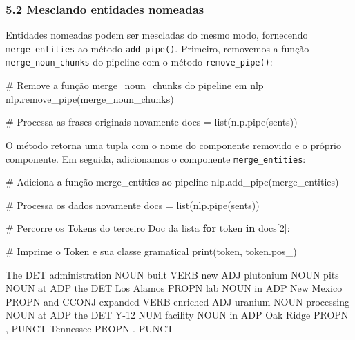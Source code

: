 \documentclass[
  brazilian,
  11pt,
]{article}
\newenvironment{Shaded}{\begin{snugshade}}{\end{snugshade}}
\newcommand{\BuiltInTok}[1]{\textcolor[rgb]{0.50,0.55,0.55}{#1}}
\newcommand{\CommentTok}[1]{\textcolor[rgb]{0.48,0.49,0.49}{#1}}
\newcommand{\ControlFlowTok}[1]{\textcolor[rgb]{0.99,0.74,0.29}{\textbf{#1}}}
\newcommand{\DecValTok}[1]{\textcolor[rgb]{0.96,0.45,0.00}{#1}}
\newcommand{\KeywordTok}[1]{\textcolor[rgb]{0.81,0.81,0.76}{\textbf{#1}}}
\newcommand{\NormalTok}[1]{\textcolor[rgb]{0.81,0.81,0.76}{#1}}
\newcommand{\OperatorTok}[1]{\textcolor[rgb]{0.81,0.81,0.76}{#1}}
\newcommand{\StringTok}[1]{\textcolor[rgb]{0.96,0.31,0.31}{#1}}
\let\oldtexttt\texttt
\renewcommand{\texttt}[1]{{\color{inlink}\oldtexttt{#1}}}
\begin{document}
\subsubsection{5.2 Mesclando entidades
nomeadas}\label{mesclando-entidades-nomeadas}

Entidades nomeadas podem ser mescladas do mesmo modo, fornecendo
\texttt{merge\_entities} ao método \texttt{add\_pipe()}. Primeiro,
removemos a função \texttt{merge\_noun\_chunks} do pipeline com o método
\texttt{remove\_pipe()}:

\begin{Shaded}
\begin{Highlighting}[]
\CommentTok{\# Remove a função \textquotesingle{}merge\_noun\_chunks\textquotesingle{} do pipeline em \textquotesingle{}nlp\textquotesingle{}}
\NormalTok{nlp.remove\_pipe(}\StringTok{\textquotesingle{}merge\_noun\_chunks\textquotesingle{}}\NormalTok{)}

\CommentTok{\# Processa as frases originais novamente}
\NormalTok{docs }\OperatorTok{=} \BuiltInTok{list}\NormalTok{(nlp.pipe(sents))}
\end{Highlighting}
\end{Shaded}

O método retorna uma tupla com o nome do componente removido e o próprio
componente. Em seguida, adicionamos o componente
\texttt{merge\_entities}:

\begin{Shaded}
\begin{Highlighting}[]
\CommentTok{\# Adiciona a função \textquotesingle{}merge\_entities\textquotesingle{} ao pipeline}
\NormalTok{nlp.add\_pipe(}\StringTok{\textquotesingle{}merge\_entities\textquotesingle{}}\NormalTok{)}

\CommentTok{\# Processa os dados novamente}
\NormalTok{docs }\OperatorTok{=} \BuiltInTok{list}\NormalTok{(nlp.pipe(sents))}

\CommentTok{\# Percorre os Tokens do terceiro Doc da lista}
\ControlFlowTok{for}\NormalTok{ token }\KeywordTok{in}\NormalTok{ docs[}\DecValTok{2}\NormalTok{]:}

    \CommentTok{\# Imprime o Token e sua classe gramatical}
    \BuiltInTok{print}\NormalTok{(token, token.pos\_)}
\end{Highlighting}
\end{Shaded}

\begin{Shaded}
\begin{Highlighting}[]
\NormalTok{The DET}
\NormalTok{administration NOUN}
\NormalTok{built VERB}
\NormalTok{new ADJ}
\NormalTok{plutonium NOUN}
\NormalTok{pits NOUN}
\NormalTok{at ADP}
\NormalTok{the DET}
\NormalTok{Los Alamos PROPN}
\NormalTok{lab NOUN}
\NormalTok{in ADP}
\NormalTok{New Mexico PROPN}
\NormalTok{and CCONJ}
\NormalTok{expanded VERB}
\NormalTok{enriched ADJ}
\NormalTok{uranium NOUN}
\NormalTok{processing NOUN}
\NormalTok{at ADP}
\NormalTok{the DET}
\NormalTok{Y{-}12 NUM}
\NormalTok{facility NOUN}
\NormalTok{in ADP}
\NormalTok{Oak Ridge PROPN}
\NormalTok{, PUNCT}
\NormalTok{Tennessee PROPN}
\NormalTok{. PUNCT}
\end{Highlighting}
\end{Shaded}
\end{document}
